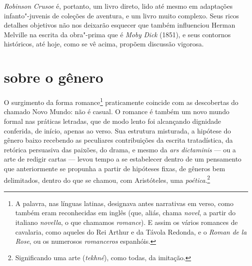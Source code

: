 \emph{Robinson Crusoe} é, portanto, um livro direto, lido até mesmo em
adaptações infanto"-juvenis de coleções de aventura, e um livro muito
complexo. Seus ricos detalhes objetivos não nos deixarão esquecer que
também influenciou Herman Melville na escrita da obra"-prima que é
\emph{Moby Dick} (1851), e seus contornos históricos, até hoje, como se
vê acima, propõem discussão vigorosa.



\section{sobre o gênero}

O surgimento da forma romance\footnote{A palavra, nas línguas latinas,
  designava antes narrativas em verso, como também eram reconhecidas em
  inglês (que, aliás, chama \emph{novel}, a partir do italiano
  \emph{novella}, o que chamamos \emph{romance}). E assim os vários
  romances de cavalaria, como aqueles do Rei Arthur e da Távola Redonda,
  e o \emph{Roman de la Rose}, ou os numerosos \emph{romanceros}
  espanhóis.} praticamente coincide com as descobertas do chamado Novo
Mundo: não é casual. O romance é também um novo mundo formal nas
práticas letradas, que de modo lento foi alcançando dignidade conferida,
de início, apenas ao verso. Sua estrutura misturada, a hipótese do
gênero baixo recebendo as peculiares contribuições da escrita
tratadística, da retórica persuasiva das paixões, do drama, e mesmo da
\emph{ars dictaminis} --- ou a arte de redigir cartas --- levou tempo a
se estabelecer dentro de um pensamento que anteriormente se propunha a
partir de hipóteses fixas, de gêneros bem delimitados, dentro do que se
chamou, com Aristóteles, uma \emph{poética}.\footnote{Significando uma
  arte (\emph{tekhné}), como todas, da imitação.}

